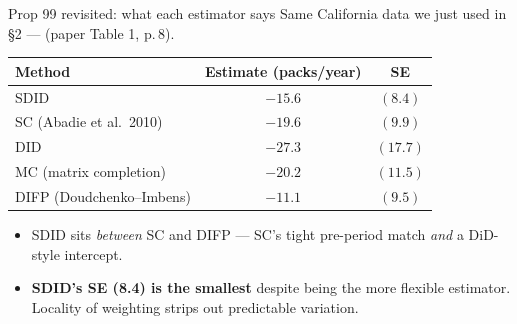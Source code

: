\documentclass[aspectratio=169,11pt]{beamer}
\begin{document}
\begin{frame}{Prop 99 revisited: what each estimator says}
\footnotesize
Same California data we just used in \S2 ---  (paper Table 1, p.\,8).
\vspace{0.3em}
\begin{center}
\renewcommand{\arraystretch}{1.15}
\begin{tabular}{lcc}
\toprule
\textbf{Method} & \textbf{Estimate} (packs/year) & \textbf{SE} \\
\midrule
SDID & $-15.6$ & $(8.4)$ \\
SC (Abadie et al.\ 2010) & $-19.6$ & $(9.9)$ \\
DID & $-27.3$ & $(17.7)$ \\
MC (matrix completion) & $-20.2$ & $(11.5)$ \\
DIFP (Doudchenko--Imbens) & $-11.1$ & $(9.5)$ \\
\bottomrule
\end{tabular}
\end{center}
\vspace{0.4em}
\begin{itemize}\setlength\itemsep{2pt}
  \item SDID sits \textit{between} SC and DIFP --- SC's tight pre-period match \textit{and} a DiD-style intercept.
  \item \textbf{SDID's SE (8.4) is the smallest} despite being the more flexible estimator. \;Locality of weighting strips out predictable variation.
\end{itemize}
\end{frame}

\end{document}
